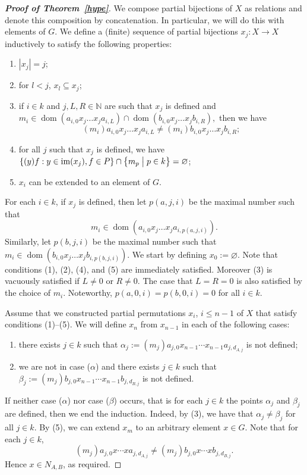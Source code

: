 \documentclass[11pt]{amsart}
\makeatletter
\theoremstyle{definition}
\newcommand{\N}{\mathbb N}
\newcommand{\im}{\operatorname{im}}
\newcommand{\makeset}[2]{\left\lbrace #1 \;\middle|\;
 \begin{tabular}{@{}l@{}}
   #2
  \end{tabular}
  \right\rbrace}
\makeatother
\begin{document}
\begin{proof}[{\bf Proof of Theorem~\ref{hype}}]
We compose partial bijections of $X$ as relations and denote this composition by concatenation. In particular, we will do this with elements of $G$.
We define a (finite) sequence of partial bijections \(x_j:X \to X\) inductively to satisfy the following properties:
\begin{enumerate}
\item \(|x_j| = j\);
\item for \(l< j\), \(x_l \subseteq x_j\);
    \item if \(i\in k\) and \(j, L, R\in \N\) are such that \(x_j\) is defined and 
    \(m_i\in \operatorname{dom}(a_{i, 0}x_{j} \ldots x_{j} a_{i, L})\cap \operatorname{dom}(b_{i, 0}x_{j} \ldots x_{j} b_{i, R}),\)
    then we have
    \[(m_i) a_{i, 0}x_{j} \ldots x_{j} a_{i, L} \neq (m_i) b_{i, 0}x_{j} \ldots x_{j} b_{i, R};\]
    \item for all \(j\) such that $x_j$ is defined, we have $\{(y)f: y\in\im(x_j), f\in P\}\cap \makeset{m_{p}}{\(p\in k\)} = \varnothing$;
    \item \(x_i\) can be extended to an element of \(G\).
\end{enumerate}
For each $i\in k$, if $x_j$ is defined, then let $p(a,j,i)$ be the maximal number such that 
    $$m_i \in \operatorname{dom}(a_{i, 0}x_{j}\ldots x_{j} a_{i, p(a,j,i)}).$$ Similarly, let $p(b,j,i)$ be the maximal number such that 
    $m_i \in \operatorname{dom}(b_{i, 0}x_{j}\ldots x_{j} b_{i, p(b,j,i)})$.
We start by defining \(x_0:= \varnothing\). 
Note that conditions (1), (2), (4), and (5) are immediately satisfied.
Moreover (3) is vacuously satisfied if \(L\neq 0\) or \(R\neq 0\).
The case that \(L=R=0\) is also satisfied by the choice of \(m_i\). Noteworthy, $p(a,0,i)=p(b,0,i)=0$ for all $i\in k$.


Assume that we constructed partial permutations $x_{i}$, $i\leq n-1$ of $X$ that satisfy conditions (1)--(5).
We will define \(x_n\) from \(x_{n-1}\) in each of the following cases: 
\begin{enumerate}
    \item[($\alpha$)] there exists $j\in k$ such that $\alpha_j:=(m_j)a_{j,0}x_{n-1}\cdots x_{n-1}a_{j,d_{A,j}}$ is not defined;
    \item[($\beta$)] we are not in case ($\alpha$) and there exists $j\in k$ such that $\beta_j:=(m_j)b_{j,0}x_{n-1}\cdots x_{n-1}b_{j,d_{B,j}}$ is not defined.
\end{enumerate}
If neither case ($\alpha$) nor case ($\beta$) occurs, that is for each $j\in k$ the points $\alpha_j$ and $\beta_j$ are defined, then we end the induction. Indeed, by (3), we have that $\alpha_j\neq\beta_j$ for all $j\in k$. By (5), we can extend $x_{m}$ to an arbitrary element $x\in G$. 
Note that for each $j\in k$, $$(m_j)a_{j,0}x\cdots xa_{j,d_{A,j}}\neq (m_j)b_{j,0}x\cdots xb_{j,d_{B,j}}.$$
Hence $x\in N_{A,B}$, as required. 



\end{proof}
\end{document}
